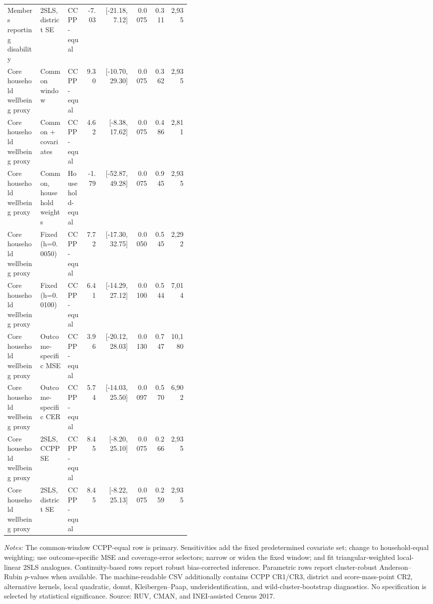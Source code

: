 \begin{longtable}{p{0.18\linewidth}p{0.15\linewidth}p{0.10\linewidth}rrrrr}
Members reporting disability & 2SLS, district SE & CCPP-equal & -7.03 & [-21.18, 7.12] & 0.0075 & 0.311 & 2,935 \\
Core household wellbeing proxy & Common window & CCPP-equal & 9.30 & [-10.70, 29.30] & 0.0075 & 0.362 & 2,935 \\
Core household wellbeing proxy & Common + covariates & CCPP-equal & 4.62 & [-8.38, 17.62] & 0.0075 & 0.486 & 2,811 \\
Core household wellbeing proxy & Common, household weights & Household-equal & -1.79 & [-52.87, 49.28] & 0.0075 & 0.945 & 2,935 \\
Core household wellbeing proxy & Fixed (h=0.0050) & CCPP-equal & 7.72 & [-17.30, 32.75] & 0.0050 & 0.545 & 2,292 \\
Core household wellbeing proxy & Fixed (h=0.0100) & CCPP-equal & 6.41 & [-14.29, 27.12] & 0.0100 & 0.544 & 7,014 \\
Core household wellbeing proxy & Outcome-specific MSE & CCPP-equal & 3.96 & [-20.12, 28.03] & 0.0130 & 0.747 & 10,180 \\
Core household wellbeing proxy & Outcome-specific CER & CCPP-equal & 5.74 & [-14.03, 25.50] & 0.0097 & 0.570 & 6,902 \\
Core household wellbeing proxy & 2SLS, CCPP SE & CCPP-equal & 8.45 & [-8.20, 25.10] & 0.0075 & 0.266 & 2,935 \\
Core household wellbeing proxy & 2SLS, district SE & CCPP-equal & 8.45 & [-8.22, 25.13] & 0.0075 & 0.259 & 2,935 \\
\bottomrule
\end{longtable}
\begin{minipage}{0.98\linewidth}\footnotesize\textit{Notes:} The common-window CCPP-equal row is primary. Sensitivities add the fixed predetermined covariate set; change to household-equal weighting; use outcome-specific MSE and coverage-error selectors; narrow or widen the fixed window; and fit triangular-weighted local-linear 2SLS analogues. Continuity-based rows report robust bias-corrected inference. Parametric rows report cluster-robust Anderson--Rubin \(p\)-values when available. The machine-readable CSV additionally contains CCPP CR1/CR3, district and score-mass-point CR2, alternative kernels, local quadratic, donut, Kleibergen--Paap, underidentification, and wild-cluster-bootstrap diagnostics. No specification is selected by statistical significance. Source: RUV, CMAN, and INEI-assisted Census 2017.\end{minipage}
\endgroup
